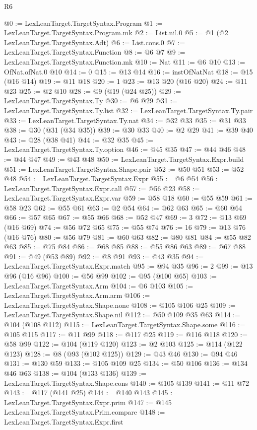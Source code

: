 \begin{lexlean}{R6}
\begin{coremodule}
@0 := LexLeanTarget.TargetSyntax.Program
@1 := LexLeanTarget.TargetSyntax.Program.mk
@2 := List.nil.{0}
@5 := @1 (@2 LexLeanTarget.TargetSyntax.Adt)
@6 := List.cons.{0}
@7 := LexLeanTarget.TargetSyntax.Function
@8 := @6 @7
@9 := LexLeanTarget.TargetSyntax.Function.mk
@10 := Nat
@11 := @6 @10
@13 := OfNat.ofNat.{0} @10
@14 := 0
@15 := @13 @14
@16 := instOfNatNat
@18 := @15 (@16 @14)
@19 := @11 @18
@20 := 1
@23 := @13 @20 (@16 @20)
@24 := @11 @23
@25 := @2 @10
@28 := @9 (@19 (@24 @25))
@29 := LexLeanTarget.TargetSyntax.Ty
@30 := @6 @29
@31 := LexLeanTarget.TargetSyntax.Ty.list
@32 := LexLeanTarget.TargetSyntax.Ty.pair
@33 := LexLeanTarget.TargetSyntax.Ty.nat
@34 := @32 @33
@35 := @31 @33
@38 := @30 (@31 (@34 @35))
@39 := @30 @33
@40 := @2 @29
@41 := @39 @40
@43 := @28 (@38 @41)
@44 := @32 @35
@45 := LexLeanTarget.TargetSyntax.Ty.option
@46 := @45 @35
@47 := @44 @46
@48 := @44 @47
@49 := @43 @48
@50 := LexLeanTarget.TargetSyntax.Expr.build
@51 := LexLeanTarget.TargetSyntax.Shape.pair
@52 := @50 @51
@53 := @52 @48
@54 := LexLeanTarget.TargetSyntax.Expr
@55 := @6 @54
@56 := LexLeanTarget.TargetSyntax.Expr.call
@57 := @56 @23
@58 := LexLeanTarget.TargetSyntax.Expr.var
@59 := @58 @18
@60 := @55 @59
@61 := @58 @23
@62 := @55 @61
@63 := @2 @54
@64 := @62 @63
@65 := @60 @64
@66 := @57 @65
@67 := @55 @66
@68 := @52 @47
@69 := 3
@72 := @13 @69 (@16 @69)
@74 := @56 @72 @65
@75 := @55 @74
@76 := 16
@79 := @13 @76 (@16 @76)
@80 := @56 @79
@81 := @60 @63
@82 := @80 @81
@84 := @55 @82 @63
@85 := @75 @84
@86 := @68 @85
@88 := @55 @86 @63
@89 := @67 @88
@91 := @49 (@53 @89)
@92 := @8 @91
@93 := @43 @35
@94 := LexLeanTarget.TargetSyntax.Expr.match
@95 := @94 @35
@96 := 2
@99 := @13 @96 (@16 @96)
@100 := @56 @99
@102 := @95 (@100 @65)
@103 := LexLeanTarget.TargetSyntax.Arm
@104 := @6 @103
@105 := LexLeanTarget.TargetSyntax.Arm.arm
@106 := LexLeanTarget.TargetSyntax.Shape.none
@108 := @105 @106 @25
@109 := LexLeanTarget.TargetSyntax.Shape.nil
@112 := @50 @109 @35 @63
@114 := @104 (@108 @112)
@115 := LexLeanTarget.TargetSyntax.Shape.some
@116 := @105 @115
@117 := @11 @99
@118 := @117 @25
@119 := @116 @118
@120 := @58 @99
@122 := @104 (@119 @120)
@123 := @2 @103
@125 := @114 (@122 @123)
@128 := @8 (@93 (@102 @125))
@129 := @43 @46
@130 := @94 @46
@131 := @130 @59
@133 := @105 @109 @25
@134 := @50 @106
@136 := @134 @46 @63
@138 := @104 (@133 @136)
@139 := LexLeanTarget.TargetSyntax.Shape.cons
@140 := @105 @139
@141 := @11 @72
@143 := @117 (@141 @25)
@144 := @140 @143
@145 := LexLeanTarget.TargetSyntax.Expr.prim
@147 := @145 LexLeanTarget.TargetSyntax.Prim.compare
@148 := LexLeanTarget.TargetSyntax.Expr.first

\end{coremodule}
\end{lexlean}

